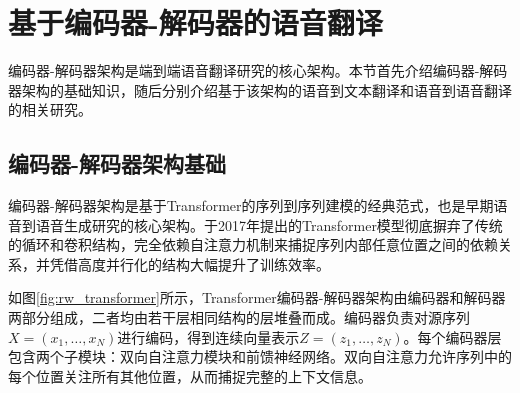 \section{基于编码器-解码器的语音翻译}\label{sec:rw_encdec_all}

编码器-解码器架构是端到端语音翻译研究的核心架构。本节首先介绍编码器-解码器架构的基础知识，随后分别介绍基于该架构的语音到文本翻译和语音到语音翻译的相关研究。

\subsection{编码器-解码器架构基础}\label{sec:rw_encdec}

编码器-解码器架构是基于Transformer的序列到序列建模的经典范式，也是早期语音到语音生成研究的核心架构。\citet{transformer}于2017年提出的Transformer模型彻底摒弃了传统的循环和卷积结构，完全依赖自注意力机制来捕捉序列内部任意位置之间的依赖关系，并凭借高度并行化的结构大幅提升了训练效率。

如图\ref{fig:rw_transformer}所示，Transformer编码器-解码器架构由编码器和解码器两部分组成，二者均由若干层相同结构的层堆叠而成。编码器负责对源序列$X=(x_1,\ldots,x_N)$进行编码，得到连续向量表示$Z=(z_1,\ldots,z_N)$。每个编码器层包含两个子模块：双向自注意力模块和前馈神经网络。双向自注意力允许序列中的每个位置关注所有其他位置，从而捕捉完整的上下文信息。

